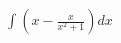 \documentclass[preview]{standalone}
\begin{document}
\begin{align*}
\int \left( x - \frac{x}{x^2 + 1} \right) dx
\end{align*}
\end{document}
